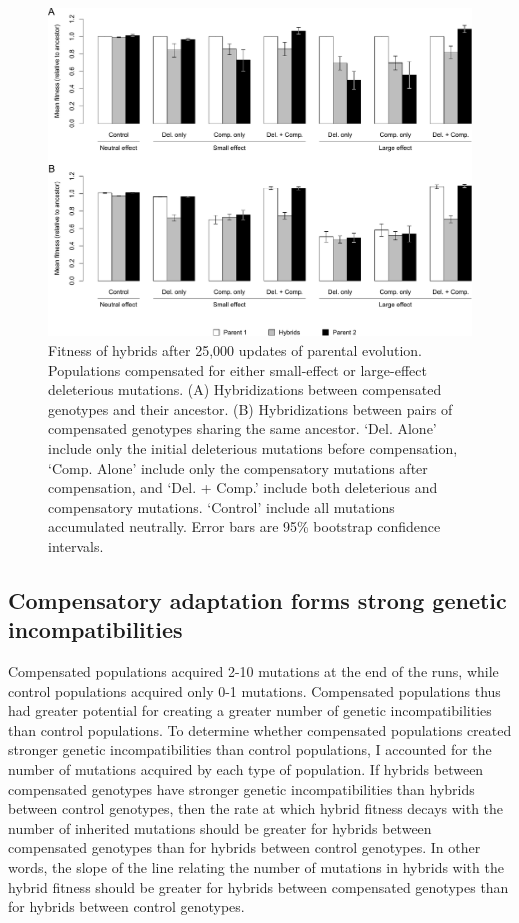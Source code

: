 \begin{doublespace}
\begin{figure}
\centering
\includegraphics[width=\linewidth]{fig1.pdf}
\caption{Fitness of hybrids after 25,000 updates of parental evolution.
  Populations compensated for either small-effect or large-effect
  deleterious mutations.
  (A) Hybridizations between compensated genotypes and their ancestor.
  (B) Hybridizations between pairs of compensated genotypes
  sharing the same ancestor.
  `Del. Alone' include only the initial deleterious mutations
  before compensation,
  `Comp. Alone' include only the compensatory mutations after compensation,
  and `Del. + Comp.' include both deleterious and compensatory mutations.
  `Control' include all mutations accumulated neutrally.
  Error bars are 95\% bootstrap confidence intervals.}
\label{fig1}
\end{figure}



\subsection{Compensatory adaptation forms strong genetic incompatibilities}

Compensated populations acquired 2-10 mutations at the end of the runs,
while control populations acquired only 0-1 mutations.
%
Compensated populations thus had greater potential for creating
a greater number of genetic incompatibilities than control populations.
%
To determine whether compensated populations created stronger
genetic incompatibilities than control populations,
I accounted for the number of mutations acquired by each type of population.
%
If hybrids between compensated genotypes
have stronger genetic incompatibilities
than hybrids between control genotypes,
then the rate at which hybrid fitness decays
with the number of inherited mutations
should be greater for hybrids between compensated genotypes
than for hybrids between control genotypes.
%
In other words, the slope of the line relating
the number of mutations in hybrids
with the hybrid fitness should be greater
for hybrids between compensated genotypes
than for hybrids between control genotypes.




\end{doublespace}
